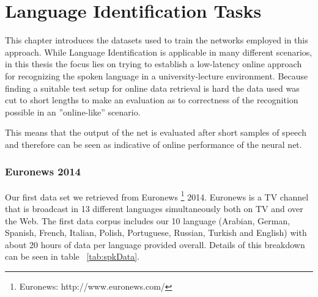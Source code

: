 



\chapter{Language Identification Tasks}
\label{ch:LITasks}
This chapter introduces the datasets used to train the networks employed in this approach. While Language Identification is applicable in many different scenarios, in this thesis the focus lies on trying to establish a low-latency online approach for recognizing the spoken language in a university-lecture environment. Because finding a suitable test setup for online data retrieval is hard the data used was cut to short lengths to make an evaluation as to correctness of the recognition possible in an ''online-like'' scenario. 

This means that the output of the net is evaluated after short samples of speech and therefore can be seen as indicative of online performance of the neural net.

\subsection{Euronews 2014}
\label{sec:LITasks:Euronews}
Our first data set we retrieved from Euronews \footnote{Euronews: http://www.euronews.com/} 2014. Euronews is a TV channel that is broadcast in 13 different languages simultaneously both on TV and over the Web. The first data corpus includes our 10 language (Arabian, German, Spanish, French, Italian, Polish, Portuguese, Russian, Turkish and English)  with about 20 hours of data per language provided overall. Details of this breakdown can be seen in table ~\ref{tab:spkData}.

